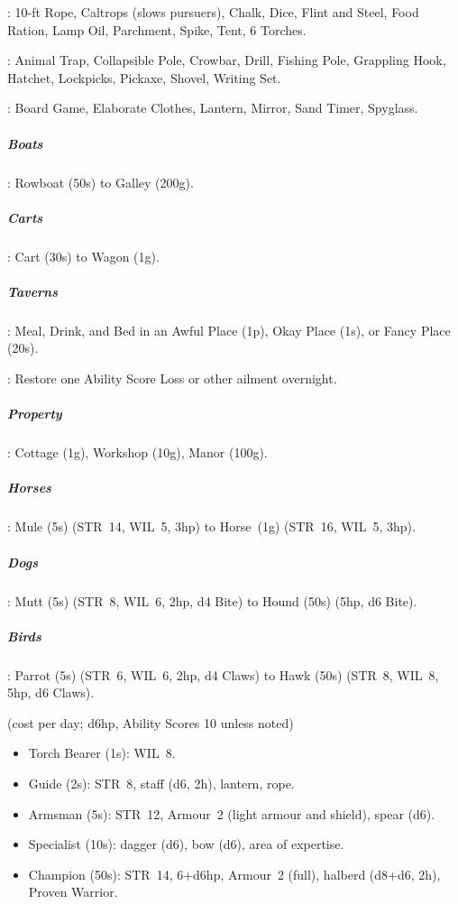 \documentclass[itdr]{subfiles}
\begin{document}
: 10-ft Rope, Caltrops (slows pursuers), Chalk, Dice, Flint and Steel, Food Ration, Lamp Oil, Parchment, Spike, Tent, 6 Torches.

: Animal Trap, Collapsible Pole, Crowbar, Drill, Fishing Pole, Grappling Hook, Hatchet, Lockpicks, Pickaxe, Shovel, Writing Set.

: Board Game, Elaborate Clothes, Lantern, Mirror, Sand Timer, Spyglass.


\subparagraph{Boats}: Rowboat (50s) to Galley (200g).
	
\subparagraph{Carts}: Cart (30s) to Wagon (1g).

\subparagraph{Taverns}: Meal, Drink, and Bed in an Awful Place (1p), Okay Place (1s), or Fancy Place (20s).

: Restore one Ability Score Loss or other ailment overnight.

\subparagraph{Property}: Cottage (1g), Workshop (10g), Manor (100g).

\subparagraph{Horses}: Mule (5s) (STR~14, WIL~5, 3hp) to Horse~(1g) (STR~16, WIL~5, 3hp).

\subparagraph{Dogs}: Mutt (5s) (STR~8, WIL~6, 2hp, d4 Bite) to Hound (50s) (5hp, d6 Bite).

\subparagraph{Birds}: Parrot (5s) (STR~6, WIL~6, 2hp, d4 Claws) to Hawk (50s) (STR~8, WIL~8, 5hp, d6 Claws).

 (cost per day; d6hp, Ability Scores 10
unless noted)
\vspace{-0.1em}
\begin{itemize}
	\item Torch Bearer (1s): WIL~8.
	\item Guide (2s): STR~8, staff (d6, 2h), lantern, rope.
	\item Armsman (5s): STR~12, Armour~2 (light armour and shield), spear (d6).
	\item Specialist (10s): dagger (d6), bow (d6), area of expertise.
	\item Champion (50s): STR~14, 6+d6hp, Armour~2 (full), halberd (d8+d6, 2h), Proven Warrior.
\end{itemize}

\break

\end{document}
